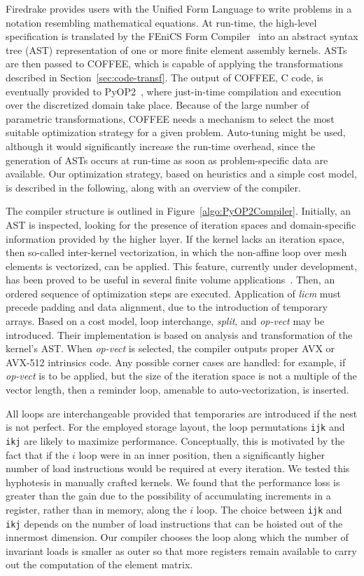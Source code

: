 \documentclass[conference]{IEEEtran}
\begin{document}
Firedrake provides users with the Unified Form Language to write problems in a notation resembling mathematical equations. At run-time, the high-level specification is translated by the FEniCS Form Compiler~\cite{FFC-Compiler} into an abstract syntax tree (AST) representation of one or more finite element assembly kernels. ASTs are then passed to COFFEE, which is capable of applying the transformations described in Section~\ref{sec:code-transf}. The output of COFFEE, C code, is eventually provided to PyOP2~\cite{pyop2isc}, where just-in-time compilation and execution over the discretized domain take place. Because of the large number of parametric transformations, COFFEE needs a mechanism to select the most suitable optimization strategy for a given problem. Auto-tuning might be used, although it would significantly increase the run-time overhead, since the generation of ASTs occurs at run-time as soon as problem-specific data are available. Our optimization strategy, based on heuristics and a simple cost model, is described in the following, along with an overview of the compiler.

The compiler structure is outlined in Figure~\ref{algo:PyOP2Compiler}. Initially, an AST is inspected, looking for the presence of iteration spaces and domain-specific information provided by the higher layer. If the kernel lacks an iteration space, then so-called inter-kernel vectorization, in which the non-affine loop over mesh elements is vectorized, can be applied. This feature, currently under development, has been proved to be useful in several finite volume applications~\cite{inter-kernel-vect}. Then, an ordered sequence of optimization steps are executed. Application of \emph{licm} must precede padding and data alignment, due to the introduction of temporary arrays. Based on a cost model, loop interchange, \emph{split}, and \emph{op-vect} may be introduced. Their implementation is based on analysis and transformation of the kernel's AST. When \emph{op-vect} is selected, the compiler outputs proper AVX or AVX-512 intrinsics code. Any possible corner cases are handled: for example, if \emph{op-vect} is to be applied, but the size of the iteration space is not a multiple of the vector length, then a reminder loop, amenable to auto-vectorization, is inserted.

All loops are interchangeable provided that temporaries are introduced if the nest is not perfect. For the employed storage layout, the loop permutations \texttt{ijk} and \texttt{ikj} are likely to maximize performance. Conceptually, this is motivated by the fact that if the $i$ loop were in an inner position, then a significantly higher number of load instructions would be required at every iteration. We tested this hyphotesis in manually crafted kernels. We found that the performance loss is greater than the gain due to the possibility of accumulating increments in a register, rather than in memory, along the $i$ loop. The choice between \texttt{ijk} and \texttt{ikj} depends on the number of load instructions that can be hoisted out of the innermost dimension. Our compiler chooses the loop along which the number of invariant loads is smaller as outer so that more registers remain available to carry out the computation of the element matrix.
\end{document}
